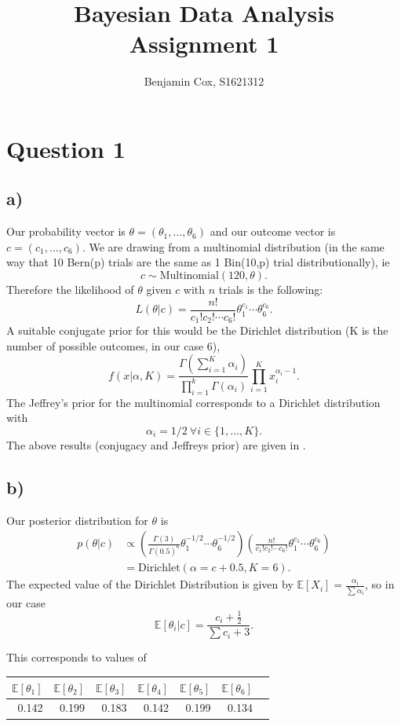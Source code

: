 \documentclass[10pt]{extarticle}
\newcommand{\E}{\mathbb{E}}
\begin{document}
	
\title{Bayesian Data Analysis Assignment 1}
\author{Benjamin Cox, S1621312}
\date{\vspace{-5ex}}
\maketitle

\section*{Question 1}

\subsection*{a)}
Our probability vector is $\theta = (\theta_1, \dots, \theta_6)$ and our outcome vector is $c = (c_1, \dots, c_6).$ We are drawing from a multinomial distribution (in the same way that 10 Bern(p) trials are the same as 1 Bin(10,p) trial distributionally), ie $$c \sim \mathrm{Multinomial}(120, \theta).$$ Therefore the likelihood of $\theta$ given $c$ with $n$ trials is the following: $$L(\theta|c) = \frac{n!}{c_1!c_2!\cdots c_6!}\theta_1^{c_1}\cdots\theta_6^{c_6}.$$ A suitable conjugate prior for this would be the Dirichlet distribution (K is the number of possible outcomes, in our case 6), $$f(x| \alpha, K) = \frac{\Gamma(\sum_{i=1}^{K}\alpha_i)}{\prod_{i=1}^{k}\Gamma(\alpha_i)}\prod_{i=1}^{K}x_i^{\alpha_i-1}.$$
The Jeffrey's prior for the multinomial corresponds to a Dirichlet distribution with $$\alpha_i = 1/2\  \forall i\in \{1,\dots,K\}.$$
The above results (conjugacy and Jeffreys prior) are given in \cite{mnpriors}.
\subsection*{b)}
Our posterior distribution for $\theta$ is 
\begin{align*}
p(\theta|c) &\propto \left(\frac{\Gamma(3)}{\Gamma(0.5)^6}\theta_1^{-1/2}\cdots\theta_6^{-1/2}\right)\left(\frac{n!}{c_1!c_2!\cdots c_6!}\theta_1^{c_1}\cdots\theta_6^{c_6}\right)\\
&= \mathrm{Dirichlet}\left(\alpha = c+0.5, K = 6\right).
\end{align*}
The expected value of the Dirichlet Distribution is given by $\E\left[X_i\right] = \frac{\alpha_i}{\sum\alpha_i}$, so in our case $$\E\left[\theta_i|c\right] = \frac{c_i+\frac{1}{2}}{\sum c_i + 3}.$$

This corresponds to values of 
\begin{table}[H]
	\centering
	\begin{tabular}{rrrrrrr}
		\hline
		$\E\left[\theta_1\right]$ & $\E\left[\theta_2\right]$ & $\E\left[\theta_3\right]$ & $\E\left[\theta_4\right]$ & $\E\left[\theta_5\right]$ & $\E\left[\theta_6\right]$ \\ 
		\hline
		0.142 & 0.199 & 0.183 & 0.142 & 0.199 & 0.134 \\ 
		\hline
	\end{tabular}
\end{table}
\end{document}
